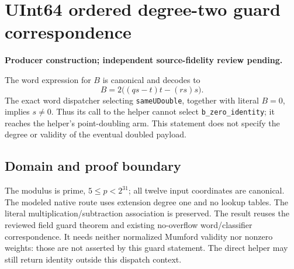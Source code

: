 \documentclass[10pt]{article}
\begin{document}
\section*{UInt64 ordered degree-two guard correspondence}
\textbf{Producer construction; independent source-fidelity review pending.}

The word expression for $B$ is canonical and decodes to
\[
 B=2\big((qs-t)t-(rs)s\big).
\]
The exact word dispatcher selecting \texttt{sameUDouble}, together with literal $B=0$, implies $s\ne0$. Thus its call to the helper cannot select \texttt{b\_zero\_identity}; it reaches the helper's point-doubling arm. This statement does not specify the degree or validity of the eventual doubled payload.

\begin{center}\end{center}
\subsection*{Domain and proof boundary}
The modulus is prime, $5\le p<2^{31}$; all twelve input coordinates are canonical. The modeled native route uses extension degree one and no lookup tables. The literal multiplication/subtraction association is preserved. The result reuses the reviewed field guard theorem and existing no-overflow word/classifier correspondence. It needs neither normalized Mumford validity nor nonzero weights: those are not asserted by this guard statement. The direct helper may still return identity outside this dispatch context.
\end{document}
